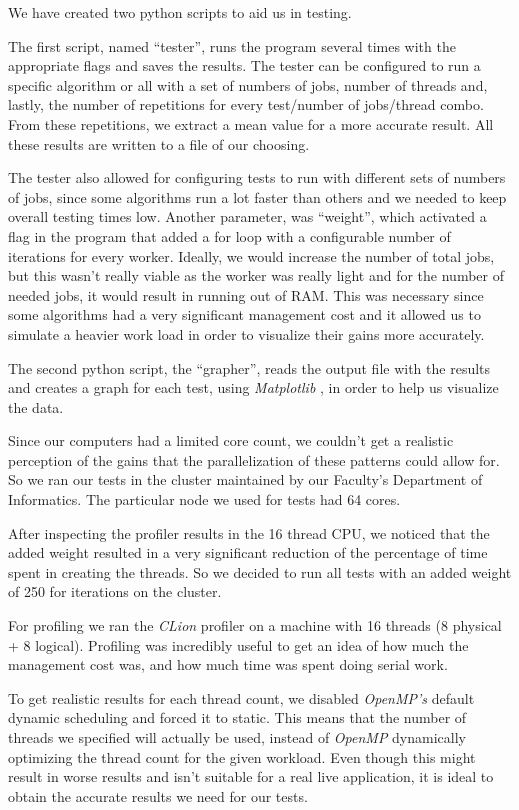 \documentclass[9pt,journal]{IEEEtran}
\begin{document}
We have created two python scripts to aid us in testing.

The first script, named “tester”, runs the program several times with the appropriate flags and saves the results. The tester can be configured to run a specific algorithm or all with a set of numbers of jobs, number of threads and, lastly, the number of repetitions for every test/number of jobs/thread combo. From these repetitions, we extract a mean value for a more accurate result. All these results are written to a file of our choosing.

The tester also allowed for configuring tests to run with different sets of numbers of jobs, since some algorithms run a lot faster than others and we needed to keep overall testing times low.  Another parameter, was “weight”, which activated a flag in the program that added a for loop with a configurable number of iterations for every worker. Ideally, we would increase the number of total jobs, but this wasn't really viable as the worker was really light and for the number of needed jobs, it would result in running out of RAM. This was necessary since some algorithms had a very significant management cost and it allowed us to simulate a heavier work load in order to visualize their gains more accurately. 

The second python script, the “grapher”, reads the output file with the results and creates a graph for each test, using \textit{Matplotlib} \cite{matplotlib}, in order to help us visualize the data. 

Since our computers had a limited core count, we couldn’t get a realistic perception of the gains that the parallelization of these patterns could allow for. So we ran our tests in the cluster maintained by our Faculty’s Department of Informatics. The particular node we used for tests had 64 cores.

After inspecting the profiler results in the 16 thread CPU, we noticed that the added weight resulted in a very significant reduction of the percentage of time spent in creating the threads. So we decided to run all tests with an added weight of 250 for iterations on the cluster.

For profiling we ran the \textit{CLion} profiler on a machine with 16 threads (8 physical + 8 logical). Profiling was incredibly useful to get an idea of how much the management cost was, and how much time was spent doing serial work.

To get realistic results for each thread count, we disabled \textit{OpenMP's} default dynamic scheduling and forced it to static. This means that the number of threads we specified will actually be used, instead of \textit{OpenMP} dynamically optimizing the thread count for the given workload. Even though this might result in worse results and isn't suitable for a real live application, it is ideal to obtain the accurate results we need for our tests.
\end{document}
